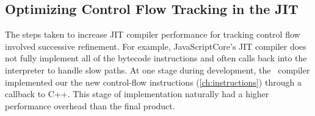\begin{enumerate}
\end{enumerate}

\subsection{Optimizing Control Flow Tracking in the JIT}
\label{sec:jitcontrolflow}

The steps taken to increase JIT compiler performance for tracking control flow involved successive refinement.
For example, JavaScriptCore's JIT compiler does not fully implement all of the bytecode instructions and often calls back into the interpreter to handle slow paths.
At one stage during development, the \JitFlow\ compiler implemented our the new control-flow instructions (\ref{ch:instructions}) through a callback to C++.
This stage of implementation naturally had a higher performance overhead than the final product.


